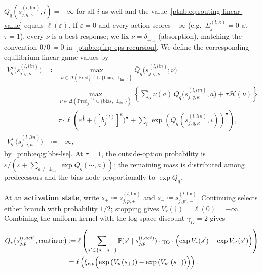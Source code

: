 \begin{definition}
$Q_q(s_{j,q,\kappa}^{(l,\mathrm{lin})},i) = -\infty$ for all $i$ as well and the
value~\eqref{ptnb:eq:routing-linear-value} equals $\ell(\varepsilon)$. If $\varepsilon=0$ and every
action scores $-\infty$ (e.g.\ $\Sigma_j^{(l,\kappa)}=0$ at $\tau=1$), every $\nu$ is a best
response; we fix $\nu=\delta_{\perp_{\mathrm{lin}}}$ (absorption), matching the convention
$0/0\coloneqq0$ in~\eqref{ptnb:eq:lrp-eps-recursion}.
We define the corresponding equilibrium linear-game values by
\begin{align}\label{ptnb:eq:routing-linear-value}
    V^\star_q \bigl( s_{j,q,\kappa}^{(l, lin)} \bigr)
    &\coloneqq
    \max_{\nu \in \Delta(\mathrm{Pred}_j^{(l)} \cup \{\mathrm{bias}, \perp_{\mathrm{lin}}\})}
    \bar Q_q\bigl(s_{j,q,\kappa}^{(l, lin)};\nu\bigr) \nonumber \\
    &=
    \max_{\nu \in \Delta(\mathrm{Pred}_j^{(l)} \cup \{\mathrm{bias}, \perp_{\mathrm{lin}}\})}
    \left\{
    \sum_{a} \nu(a)\, Q_q \bigl( s_{j,q,\kappa}^{(l, lin)}, a \bigr)
    + \tau \mathcal{H}(\nu)
    \right\} \nonumber \\
    &=
    \tau \cdot \ell \left( \varepsilon^{ \frac{1}{\tau} } +
    \bigl([b_j^{(l)}]^\kappa\bigr)^{\frac{1}{\tau}} + \sum_i \exp\left( Q_q(s_{j,q,\kappa}^{(l, lin)},
    i) \right)^{ \frac{ 1 }{ \tau } } \right), \\
    V^\star_{q'} \bigl( s_{j,q,\kappa}^{(l, lin)} \bigr)
    &\coloneqq -\infty,
\end{align}
by~\eqref{ptnb:eq:gibbs-lse}. At $\tau=1$, the outside-option probability is
$\varepsilon/(\varepsilon+\sum_{a\neq\perp_{\mathrm{lin}}}\exp Q_q(\cdots,a))$; the remaining mass
is distributed among predecessors and the bias node proportionally to $\exp Q_q$.

At an \textbf{activation state}, write $s_+\coloneqq s_{j,p,+}^{(l,\text{lin})}$ and
$s_-\coloneqq s_{j,p',-}^{(l,\text{lin})}$. Continuing selects either branch with probability
$1/2$; stopping gives $V_r(\dagger)=\ell(0)=-\infty$. Combining the uniform kernel with the
log-space discount $\gamma_O=2$ gives
\begin{align}\label{ptnb:eq:routing-activation-continue}
    Q_r \bigl( s_{j,p}^{(l, act)}, \mathrm{continue} \bigr)
    &\coloneqq
    \ell \left( \sum_{s' \in \{s_+, s_-\}} \P(s' \mid s_{j,p}^{(l, act)}) \cdot \gamma_{\mathrm{O}}
    \cdot \Bigl( \exp V_r(s') - \exp V_{r'}(s') \Bigr) \right) \nonumber \\
    &= \ell \left(
    \xi_{r,p} \Bigl( \exp\left( V_p\left( s_+ \right) \right) - \exp\left( V_{p'}\left( s_- \right)
    \right) \Bigr)
    \right).
\end{align}


\end{definition}
